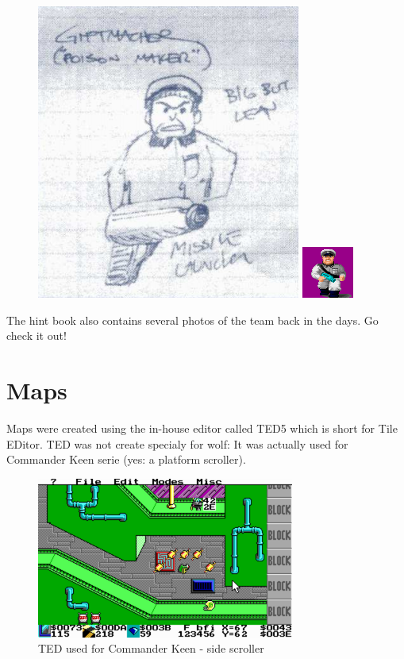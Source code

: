 \documentclass[book.tex]{subfiles}
\begin{document}
   \begin{figure}[H]
\centering
 \includegraphics[scale=0.5]{imgs/tom_hall_sketch_officer2.png}
 \includegraphics[scale=8]{imgs/sprites/giftmacher.png}

 \end{figure}
 
 
The hint book also contains several photos of the team back in the days. Go check it out!













\section{Maps}
Maps were created using the in-house editor called TED5 which is short for Tile EDitor. TED was not create specialy for wolf: It was actually used for Commander Keen serie (yes: a platform scroller).\\

 \begin{figure}[H]
\centering
 \includegraphics[width=\textwidth]{imgs/ted5_scrolling_map.png}
 \caption{TED used for Commander Keen - side scroller} \label{fig:mips}
 \end{figure}
\end{document}
